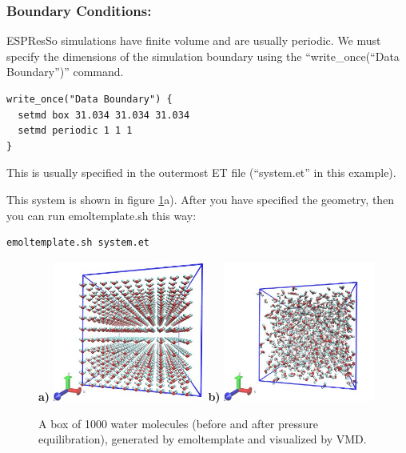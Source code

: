 \documentclass[11pt]{article}
\begin{document}
\subsubsection*{Boundary Conditions:}
\label{sec:pbc}
ESPResSo simulations have finite volume and are usually periodic. 
We must specify the dimensions of the simulation boundary 
using the ``write\_once(``Data Boundary'')'' command.  
\begin{verbatim}
write_once("Data Boundary") {
  setmd box 31.034 31.034 31.034
  setmd periodic 1 1 1
}
\end{verbatim}
This is usually specified in the outermost ET file 
(``system.et'' in this example).

This system is shown in figure \ref{fig:spce_x_1000}a).
After you have specified the geometry, 
then you can run emoltemplate.sh this way:
\begin{verbatim}
emoltemplate.sh system.et
\end{verbatim}

\begin{figure}[htbp]
\centering
\textbf{a)}
\includegraphics[width=5cm]{waterSPCEx1000_LR.jpg}
\textbf{b)}
\includegraphics[width=5cm]{waterSPCEx1000_t=25_LR.jpg}
\caption{
\label{fig:spce_x_1000}
A box of 1000 water molecules (before and after pressure equilibration), 
generated by emoltemplate and visualized by VMD.
}
\end{figure}
\end{document}
